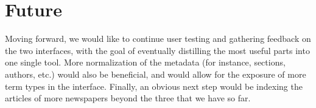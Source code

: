 \section{Future}
Moving forward, we would like to continue user testing and gathering feedback on the two interfaces, with the goal of eventually distilling the most useful parts into one single tool. More normalization of the metadata (for instance, sections, authors, etc.) would also be beneficial, and would allow for the exposure of more term types in the interface. Finally, an obvious next step would be indexing the articles of more newspapers beyond the three that we have so far.